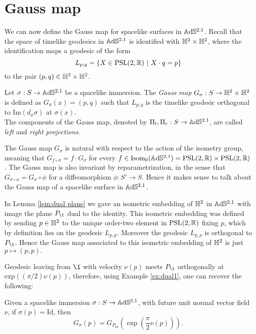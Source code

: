 \section{Gauss map} \label{sec:gauss map}
We can now define the Gauss map for spacelike surfaces in $\mathbb{A}\mathrm{d}\mathbb{S}^{2,1}$. Recall that the space of timelike geodesics in $\mathbb{A}\mathrm{d}\mathbb{S}^{2,1}$ is identified with $\mathbb{H}^2\times\mathbb{H}^2$, where the identification maps a geodesic of the form
\[
    L_{p,q}=\{ X \in\text{PSL}(2,\mathbb{R}) \ | \ X \cdot q = p \}
\]
to the pair $(p,q) \in \mathbb{H}^2\times\mathbb{H}^2$. 
\begin{definition}
    Let $\sigma :S \to\mathbb{A}\mathrm{d}\mathbb{S}^{2,1}$ be a spacelike immersion. The \textit{Gauss map} $G_\sigma : S \to \mathbb{H}^2 \times \mathbb{H}^2$ is defined as $G_\sigma(x) = (p,q)$ such that $L_{p,q}$ is the timelike geodesic orthogonal to $\text{Im}(d_x\sigma)$ at $\sigma(x)$.\\
    The components of the Gauss map, denoted by $\Pi_l, \Pi_r : S \to \mathbb{A}\mathrm{d}\mathbb{S}^{2,1}$, are called \textit{left} and \textit{right projections}. 
\end{definition}
The Gauss map $G_\sigma$ is natural with respect to the action of the isometry group, meaning that $G_{f\circ\sigma} = f \cdot G_\sigma$ for every $f \in\text{Isom}_0(\mathbb{A}\mathrm{d}\mathbb{S}^{2,1}) = \text{PSL}(2,\mathbb{R})\times\text{PSL}(2,\mathbb{R})$. The Gauss map is also invariant by reparametrization, in the sense that $G_{\sigma \circ \phi} = G_\sigma \circ \phi$ for a diffeomorphism $\phi:S'\to S$. Hence it makes sense to talk about the Gauss map of a spacelike surface in $\mathbb{A}\mathrm{d}\mathbb{S}^{2,1}$.

\begin{example}\label{ex:dual1}
    In Lemma \ref{lem:dual plane} we gave an isometric embedding of $\mathbb{H}^2$ in $\mathbb{A}\mathrm{d}\mathbb{S}^{2,1}$ with image the plane $P_{\1}$ dual to the identity. This isometric embedding was defined by sending $p\in\mathbb{H}^2$ to the unique order-two element in $\text{PSL}(2,\mathbb{R})$ fixing $p$, which by definition lies on the geodesic $L_{p,p}$. Moreover the geodesic $L_{p,p}$ is orthogonal to $P_{\1}$. Hence the Gauss map associated to this isometric embedding of $\mathbb{H}^2$ is just $p\mapsto (p,p).$
\end{example}
Geodesic leaving from $\1$ with velocity $\nu(p)$ meets $P_\1$ orthogonally at $\text{exp}((\pi/2)\nu(p))$, therefore, using Example \ref{ex:dual1}, one can recover the following:

\begin{lemma}\label{lem:Gaussid}
    Given a spacelike immersion $\sigma:S\to\mathbb{A}\mathrm{d}\mathbb{S}^{2,1}$, with future unit normal vector field $\nu$, if $\sigma(p)=\text{Id}$, then 
    \begin{equation}\label{eq:Gaussid}
        G_\sigma(p)=G_{P_\text{Id}}(\exp(\frac{\pi}{2}\nu(p))).
    \end{equation}
\end{lemma}

